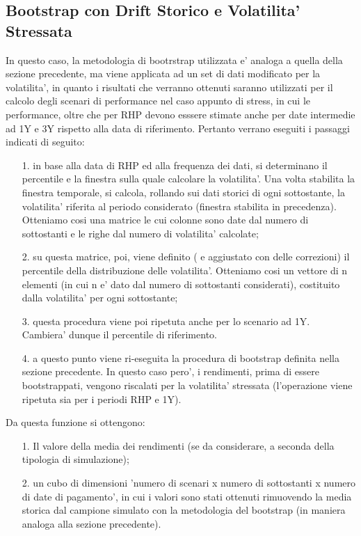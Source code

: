 \documentclass[11pt,fleqn]{extarticle}
\begin{document}
\subsection{Bootstrap con Drift Storico e Volatilita' Stressata}
In questo caso, la metodologia di bootrstrap utilizzata e' analoga a quella della sezione precedente, ma viene applicata ad un set di dati modificato per la volatilita', in quanto i risultati che verranno ottenuti saranno utilizzati per il calcolo degli scenari di performance nel caso appunto di stress, in cui le performance, oltre che per RHP devono esssere stimate anche per date intermedie ad 1Y e 3Y rispetto alla data di riferimento. Pertanto verrano eseguiti i passaggi indicati di seguito:
\begin{itemize}
\setlength\itemsep{-0.1em}
\item[1.] in base alla data di RHP ed alla frequenza dei dati, si determinano il percentile e la finestra sulla quale calcolare la volatilita'. Una volta stabilita la finestra temporale, si calcola, rollando sui dati storici di ogni sottostante, la volatilita' riferita al periodo considerato (finestra stabilita in precedenza). Otteniamo cosi una matrice le cui colonne sono date dal numero di sottostanti e le righe dal numero di volatilita' calcolate;
\item[2.] su questa matrice, poi, viene definito ( e aggiustato con delle correzioni) il percentile della distribuzione delle volatilita'. Otteniamo cosi un vettore di n elementi (in cui n e' dato dal numero di sottostanti considerati), costituito dalla volatilita' per ogni sottostante; 
\item[3.] questa procedura viene poi ripetuta anche per lo scenario ad 1Y. Cambiera' dunque il percentile di riferimento.
\item[4.] a questo punto viene ri-eseguita la procedura di bootstrap definita nella sezione precedente. In questo caso pero', i rendimenti, prima di essere bootstrappati, vengono riscalati per la volatilita' stressata (l'operazione viene ripetuta sia per i periodi RHP e 1Y).
\end{itemize}
Da questa funzione si ottengono:
\begin{itemize}
\setlength\itemsep{-0.1em}
\item[1.] Il valore della media dei rendimenti (se da considerare, a seconda della tipologia di simulazione);
\item[2.] un cubo di dimensioni 'numero di scenari x numero di sottostanti x numero di date di pagamento', in cui i valori sono stati ottenuti rimuovendo la media storica dal campione simulato con la metodologia del bootstrap (in maniera analoga alla sezione precedente).
\end{itemize}
\end{document}
